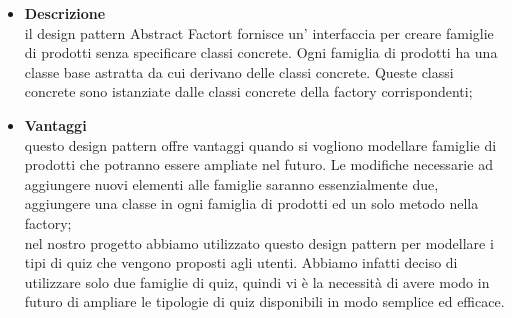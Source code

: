 		\begin{itemize}
			\item \textbf{Descrizione}\\ il design pattern Abstract Factort fornisce un' interfaccia per creare famiglie di prodotti senza specificare classi concrete. Ogni famiglia di prodotti ha una classe base astratta da cui derivano delle classi concrete. Queste classi concrete sono istanziate dalle classi concrete della factory corrispondenti;
			
			\item \textbf{Vantaggi}\\ questo design pattern offre vantaggi quando si vogliono modellare famiglie di prodotti che potranno essere ampliate nel futuro. Le modifiche necessarie ad aggiungere nuovi elementi alle famiglie saranno essenzialmente due, aggiungere una classe in ogni famiglia di prodotti ed un solo metodo nella factory;
			\utilizzo \\ nel nostro progetto abbiamo utilizzato questo design pattern per modellare i tipi di quiz che vengono proposti agli utenti. Abbiamo infatti deciso di utilizzare solo due famiglie di quiz, quindi vi è la necessità di avere modo in futuro di ampliare le tipologie di quiz disponibili in modo semplice ed efficace.
			
		\end{itemize}
		
